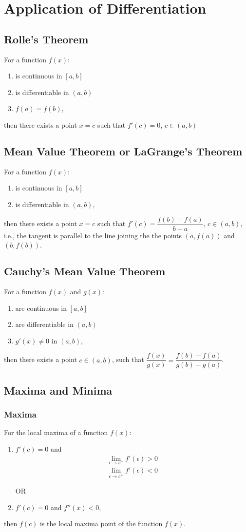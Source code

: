 \chapter{Application of Differentiation}
\section{Rolle's Theorem}
For a function $f(x)$:
\begin{enumerate}
	\item is continuous in $[a,b]$
	\item is differentiable in $(a,b)$
	\item $f(a)=f(b)$,
\end{enumerate}
then there exists a point $x=c$ such that $f'(c)=0$, $c\in(a,b)$


\section{Mean Value Theorem or LaGrange's Theorem}
For a function $f(x)$:
\begin{enumerate}
	\item is continuous in $[a,b]$
	\item is differentiable in $(a,b)$,
\end{enumerate}
then there exists a point $x=c$ such that $f'(c)=\dfrac{f(b)-f(a)}{b-a}$, $c\in(a,b)$, i.e., the tangent is parallel to the line joining the the points $(a,f(a))$ and $(b,f(b))$.


\section{Cauchy's Mean Value Theorem}
For a function $f(x)$ and $g(x)$:
\begin{enumerate}
	\item are continuous in $[a,b]$
	\item are differentiable in $(a,b)$
	\item $g'(x)\neq 0$ in $(a,b)$,
\end{enumerate}
then there exists a point $c\in(a,b)$, such that $\dfrac{f(x)}{g(x)}=\dfrac{f(b)-f(a)}{g(b)-g(a)}$.

\section{Maxima and Minima}
\subsection{Maxima}
For the local maxima of a function $f(x)$:
\begin{enumerate}
	\item $f'(c)=0$ and
	\begin{align}
		\lim_{\epsilon\to c^{-}} f'(\epsilon)>0\nonumber\\
		\lim_{\epsilon\to c^{+}} f'(\epsilon)<0\nonumber
	\end{align}
	\begin{center}
		OR
	\end{center}
	\item $f'(c)=0$ and $f''(x)<0$,
\end{enumerate}
then $f(c)$ is the local maxima point of the function $f(x)$.

